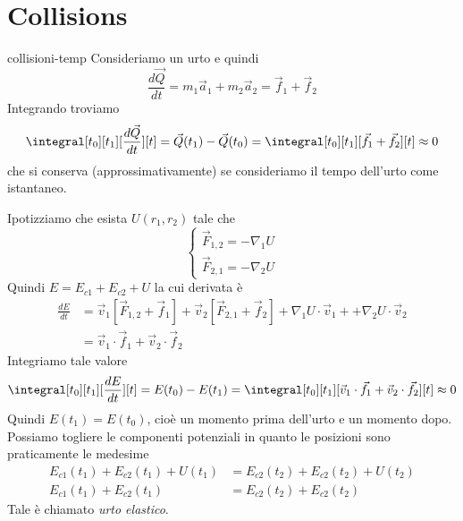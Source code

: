 \documentclass[preview]{standalone}
\begin{document}
\genpage

\section{Collisions}

\begin{snippet}{collisioni-temp}
    Consideriamo un urto e quindi
    \[
        \frac{d\vec{Q}}{dt} = m_1\vec{a}_1 + m_2\vec{a}_2 = \vec{f}_1 + \vec{f}_2
    \]
    Integrando troviamo
    \[
        \integral[t_0][t_1][\frac{d\vec{Q}}{dt}][t] = \vec{Q}(t_1) - \vec{Q}(t_0) =
        \integral[t_0][t_1][\vec{f}_1 + \vec{f}_2][t] \approx 0
    \]
    che si conserva (approssimativamente) se consideriamo il tempo dell'urto come istantaneo.

    Ipotizziamo che esista \(U(r_1, r_2)\) tale che
    \[
        \begin{cases}
            \vec{F}_{1,2} = -\nabla_1 U \\
            \vec{F}_{2,1} = -\nabla_2 U
        \end{cases}
    \]
    Quindi \(E = E_{c1} + E_{c2} + U\) la cui derivata è
    \begin{align*}
        \frac{dE}{dt} &= \vec{v}_1 \left[\vec{F}_{1,2} + \vec{f}_1\right]
        + \vec{v}_2 \left[\vec{F}_{2,1} + \vec{f}_2\right]
        + \nabla_1 U\cdot \vec{v}_1 + + \nabla_2 U\cdot \vec{v}_2 \\
        &= \vec{v}_1 \cdot \vec{f}_1 + \vec{v}_2 \cdot \vec{f}_2
    \end{align*}
    Integriamo tale valore
    \[
        \integral[t_0][t_1][\frac{dE}{dt}][t] = E(t_0) - E(t_1) =
        \integral[t_0][t_1][\vec{v}_1 \cdot \vec{f}_1 + \vec{v}_2 \cdot \vec{f}_2][t] \approx 0
    \]
    Quindi \(E(t_1) = E(t_0)\), cioè un momento prima dell'urto e un momento dopo.
    Possiamo togliere le componenti potenziali in quanto le posizioni sono praticamente le medesime
    \begin{align*}
        E_{c1}(t_1) + E_{c2}(t_1) + U(t_1) &= E_{c2}(t_2) + E_{c2}(t_2) + U(t_2) \\
        E_{c1}(t_1) + E_{c2}(t_1) &= E_{c2}(t_2) + E_{c2}(t_2)
    \end{align*}
    Tale è chiamato \emph{urto elastico}.

\end{snippet}
\end{document}
